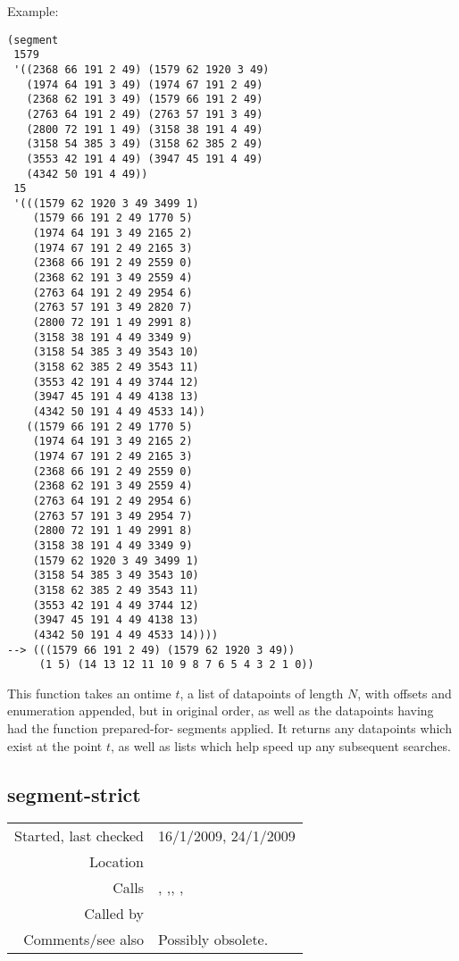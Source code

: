 \vspace{0.5cm}
\noindent Example:
\begin{verbatim}
(segment
 1579
 '((2368 66 191 2 49) (1579 62 1920 3 49)
   (1974 64 191 3 49) (1974 67 191 2 49)
   (2368 62 191 3 49) (1579 66 191 2 49)
   (2763 64 191 2 49) (2763 57 191 3 49)
   (2800 72 191 1 49) (3158 38 191 4 49)
   (3158 54 385 3 49) (3158 62 385 2 49)
   (3553 42 191 4 49) (3947 45 191 4 49)
   (4342 50 191 4 49))
 15
 '(((1579 62 1920 3 49 3499 1)
    (1579 66 191 2 49 1770 5)
    (1974 64 191 3 49 2165 2)
    (1974 67 191 2 49 2165 3)
    (2368 66 191 2 49 2559 0)
    (2368 62 191 3 49 2559 4)
    (2763 64 191 2 49 2954 6)
    (2763 57 191 3 49 2820 7)
    (2800 72 191 1 49 2991 8)
    (3158 38 191 4 49 3349 9)
    (3158 54 385 3 49 3543 10)
    (3158 62 385 2 49 3543 11)
    (3553 42 191 4 49 3744 12)
    (3947 45 191 4 49 4138 13)
    (4342 50 191 4 49 4533 14))
   ((1579 66 191 2 49 1770 5)
    (1974 64 191 3 49 2165 2)
    (1974 67 191 2 49 2165 3)
    (2368 66 191 2 49 2559 0)
    (2368 62 191 3 49 2559 4)
    (2763 64 191 2 49 2954 6)
    (2763 57 191 3 49 2954 7)
    (2800 72 191 1 49 2991 8)
    (3158 38 191 4 49 3349 9)
    (1579 62 1920 3 49 3499 1)
    (3158 54 385 3 49 3543 10)
    (3158 62 385 2 49 3543 11)
    (3553 42 191 4 49 3744 12)
    (3947 45 191 4 49 4138 13)
    (4342 50 191 4 49 4533 14))))
--> (((1579 66 191 2 49) (1579 62 1920 3 49))
     (1 5) (14 13 12 11 10 9 8 7 6 5 4 3 2 1 0))
\end{verbatim}

\noindent This function takes an ontime $t$, a list of
datapoints of length $N$, with offsets and enumeration
appended, but in original order, as well as the
datapoints having had the function prepared-for-
segments applied. It returns any datapoints which
exist at the point $t$, as well as lists which help
speed up any subsequent searches.


\subsection*{segment-strict}\label{fun:segment-strict}

\vspace{0.3cm}
\begin{tabular}{r|p{8cm}}
Started, last checked & 16/1/2009, 24/1/2009 \\
Location & \nameref{sec:segmentation} \\
Calls & \nameref{fun:add-to-list}, \nameref{fun:chord-candidates-offtimes-strict},\newline \nameref{fun:chord-candidates-ontimes}, \nameref{fun:first-n-naturals},\newline \nameref{fun:nth-list} \\
Called by & \\
Comments/see also & Possibly obsolete.
\end{tabular}

